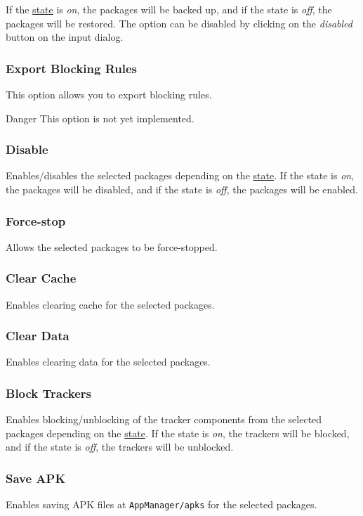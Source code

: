 If the \hyperref[subsubsec:profile-state]{state} is \textit{on}, the packages will be backed up, and if the state is
\textit{off}, the packages will be restored. The option can be disabled by clicking on the \textit{disabled} button on
the input dialog.

\subsubsection{Export Blocking Rules} %
This option allows you to export blocking rules.

\begin{danger}{Danger}
    This option is not yet implemented.
\end{danger}

\subsubsection{Disable} %
Enables/disables the selected packages depending on the \hyperref[subsubsec:profile-state]{state}. If the state is
\textit{on}, the packages will be disabled, and if the state is \textit{off}, the packages will be enabled.

\subsubsection{Force-stop} %
Allows the selected packages to be force-stopped.

\subsubsection{Clear Cache} %
Enables clearing cache for the selected packages.

\subsubsection{Clear Data} %
Enables clearing data for the selected packages.

\subsubsection{Block Trackers} %
Enables blocking/unblocking of the tracker components from the selected packages depending on the
\hyperref[subsubsec:profile-state]{state}. If the state is \textit{on}, the trackers will be blocked, and if the state
is \textit{off}, the trackers will be unblocked.

\subsubsection{Save APK} %
Enables saving APK files at \texttt{AppManager/apks} for the selected packages.
